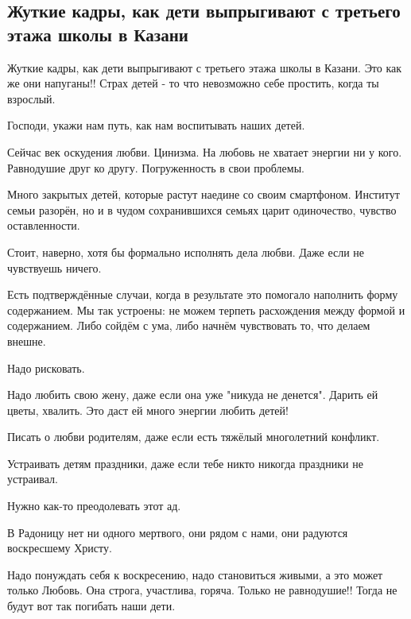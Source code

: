  
 
 
 
 
\subsection{Жуткие кадры, как дети выпрыгивают с третьего этажа школы в Казани}

Жуткие кадры, как дети выпрыгивают с третьего этажа школы в Казани. Это как же
они напуганы!! Страх детей - то что невозможно себе простить, когда ты
взрослый. 

Господи, укажи нам путь, как нам воспитывать наших детей.

Сейчас век оскудения любви. Цинизма. На любовь не хватает энергии ни у кого.
Равнодушие друг ко другу. Погруженность в свои проблемы. 

Много закрытых детей, которые растут наедине со своим смартфоном. Институт
семьи разорён, но и в чудом сохранившихся семьях царит одиночество, чувство
оставленности. 

Стоит, наверно, хотя бы формально исполнять дела любви. Даже если не чувствуешь
ничего.

Есть подтверждённые случаи, когда в результате это помогало наполнить форму
содержанием. Мы так устроены: не можем терпеть расхождения между формой и
содержанием. Либо сойдём с ума, либо начнём чувствовать то, что делаем внешне. 

Надо рисковать.

Надо любить свою жену, даже если она уже "никуда не денется". Дарить ей цветы, хвалить. Это даст ей много энергии любить детей!

Писать о любви родителям, даже если есть тяжёлый многолетний конфликт. 

Устраивать детям праздники, даже если тебе никто никогда праздники не устраивал.

Нужно как-то преодолевать этот ад.

В Радоницу нет ни одного мертвого, они рядом с нами, они радуются воскресшему
Христу.

Надо понуждать себя к воскресению, надо становиться живыми, а это может только
Любовь. Она строга, участлива, горяча. Только не равнодушие!!  Тогда не будут
вот так погибать наши дети.

